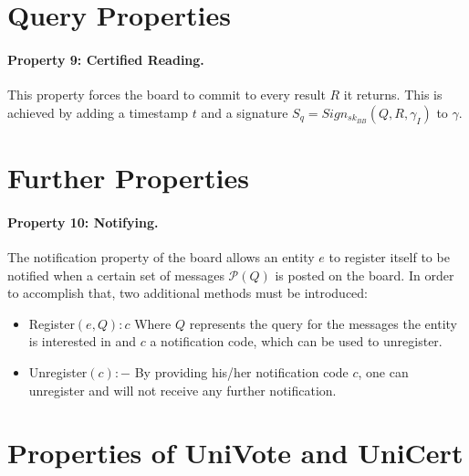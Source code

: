 \documentclass[bibtotoc,halfparskip,oneside]{scrreprt}
\begin{document}
\section{Query Properties}\label{ub3}

\paragraph*{Property 9: Certified Reading.}

This property forces the board to commit to every result $R$ it returns. This is achieved by adding a timestamp $t$ and a signature $S_q=Sign_{sk_{BB}}(Q, R, \gamma_I)$ to $\gamma$.

\section{Further Properties}

\paragraph*{Property 10: Notifying.}

The notification property of the board allows an entity  $e$ to register itself to be notified when a certain set of messages $\mathcal{P}(Q)$ is posted on the board. In order to accomplish that, two additional methods must be introduced:

\begin{itemize}
	\item Register$(e, Q): c$ \newline Where $Q$ represents the query for the messages the entity is interested in and $c$ a notification code, which can be used to unregister. 
	\item Unregister$(c):-$ \newline By providing his/her notification code $c$, one can unregister and will not receive any further notification.
\end{itemize}

\section{Properties of UniVote and UniCert}\label{ub4}
\end{document}
